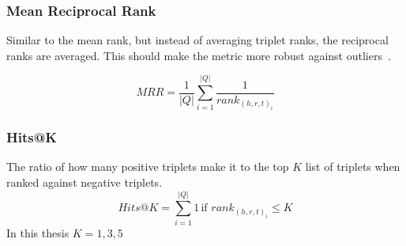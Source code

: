 \subsubsection{Mean Reciprocal Rank}
Similar to the mean rank, but instead of averaging triplet ranks, the reciprocal ranks are averaged.
This should make the metric more robust against outliers~\cite{ampligraph}.

\[
    MRR = \frac{1}{|Q|}\sum_{i = 1}^{|Q|}\frac{1}{rank_{(h, r, t)_i}}
\]

\subsubsection{Hits@K}
The ratio of how many positive triplets make it to the top $K$ list of triplets when ranked against negative triplets.
\[
    Hits@K = \sum_{i = 1}^{|Q|} 1 \, \text{if } rank_{(h, r, t)_i} \leq K
\]
In this thesis $K={1,3,5}$